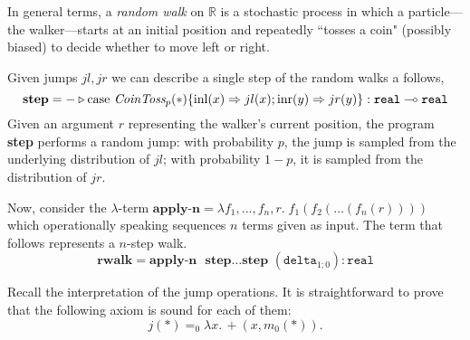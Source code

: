 \begin{example} 

In general terms, a \emph{random walk} on $\mathbb{R}$ is a stochastic process in which a particle---the walker---starts at an initial position and repeatedly ``tosses a coin" (possibly biased) to decide whether to move left or right.

Given jumps $jl,jr$ we can describe a single step of the random walks a follows,
\[
        \textbf{step} =  - \triangleright \text{case } \emph{CoinToss}_p (*) \{ \mathrm{inl}(x) \Rightarrow jl(x) ; 
        \mathrm{inr}(y) \Rightarrow jr(y) \} : \mathtt{real} \multimap \mathtt{real}
\]
Given an argument $r$ representing the walker's current position, the program \textbf{step} performs a random jump: with probability $p$, the jump is sampled from the underlying distribution of $jl$; with probability $1 - p$, it is sampled from the distribution of $jr$.

Now, consider the $\lambda$-term $\textbf{apply-n} = \lambda f_1, \dots, f_n, r .\; f_1(f_2(\dots(f_n (r))))$ which operationally speaking sequences $n$ terms given as input. The term that follows represents a $n$-step walk. 
\[
\textbf{rwalk} = \textbf{apply-n } \textbf{ step} \ldots \textbf{step } (\mathtt{delta}_{1;0}) :  \mathtt{real}
\]


Recall the interpretation of the jump operations. It is straightforward to prove that the following axiom is sound for each of them:
        \[
                j(\ast) =_0 \lambda x. \, +(x, m_0 (\ast)).
        \]


\end{example}
